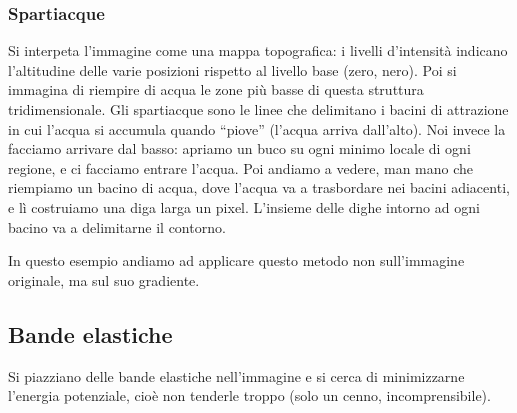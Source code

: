 \documentclass[a4paper,11pt]{article}
\begin{document}
\subsubsection{Spartiacque}
Si interpeta l'immagine come una mappa topografica: i livelli d'intensità indicano l'altitudine delle varie posizioni rispetto al livello base (zero, nero).
Poi si immagina di riempire di acqua le zone più basse di questa struttura tridimensionale. Gli spartiacque sono le linee che delimitano i bacini di attrazione
in cui l'acqua si accumula quando ``piove'' (l'acqua arriva dall'alto). Noi invece la facciamo arrivare dal basso: apriamo un buco su ogni minimo locale
di ogni regione, e ci facciamo entrare l'acqua. Poi andiamo a vedere, man mano che riempiamo un bacino di acqua, dove l'acqua va a trasbordare nei bacini adiacenti,
e lì costruiamo una diga larga un pixel. L'insieme delle dighe intorno ad ogni bacino va a delimitarne il contorno.
\par
In questo esempio andiamo ad applicare questo metodo non sull'immagine originale, ma sul suo gradiente.

\subsection{Bande elastiche}
Si piazziano delle bande elastiche nell'immagine e si cerca di minimizzarne l'energia potenziale, cioè non tenderle troppo (solo un cenno, incomprensibile).
\end{document}
